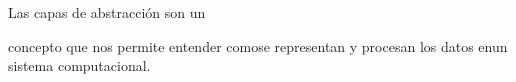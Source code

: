 \documentclass[preview]{standalone}
\begin{document}
\begin{center}
Las capas de abstracción son un

concepto que nos permite entender comose representan y procesan los datos enun sistema computacional.
\end{center}
\end{document}

